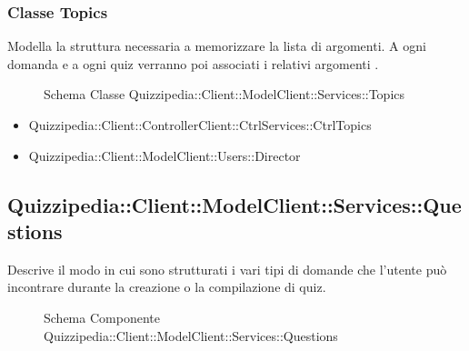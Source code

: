\subsubsection{Classe Topics}
Modella la struttura necessaria a memorizzare la lista di argomenti. A ogni domanda e a ogni quiz verranno poi associati i relativi argomenti .
\begin{figure}[H]
\centering
\noindent{}
\caption{Schema Classe Quizzipedia::Client::ModelClient::Services::Topics}
\end{figure}
\begin{itemize}
\item Quizzipedia::Client::ControllerClient::CtrlServices::CtrlTopics
\item Quizzipedia::Client::ModelClient::Users::Director
\end{itemize}
\subsection{Quizzipedia::Client::ModelClient::Services::Questions}
Descrive il modo in cui sono strutturati i vari tipi di domande che l'utente può incontrare durante la creazione o la compilazione di quiz.
\begin{figure}[H]
\centering
\noindent{}
\caption[Quizzipedia::Client::ModelClient::Services::Questions]{Schema Componente Quizzipedia::Client::ModelClient::Services::Questions}
\end{figure}
